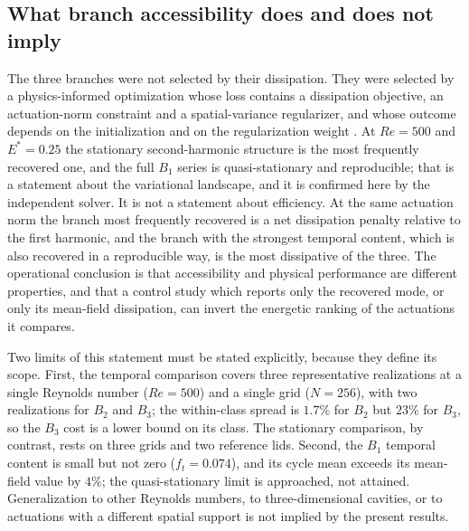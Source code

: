 \documentclass[11pt,a4paper]{article}
\newenvironment{chgdel}{\par\color{red}}{\par\color{black}}
\begin{document}
\subsection{What branch accessibility does and does not imply}

\begin{chgdel}
The three branches were not selected by their dissipation. They were selected by a
physics-informed optimization whose loss contains a dissipation objective, an
actuation-norm constraint and a spatial-variance regularizer, and whose outcome
depends on the initialization and on the regularization weight
. At $Re=500$ and $E^\ast=0.25$ the stationary
second-harmonic structure is the most frequently recovered one, and the full
$B_1$ series is quasi-stationary and reproducible; that is a statement about the
variational landscape, and it is confirmed here by the independent solver. It is
not a statement about efficiency. At the same actuation norm the branch most
frequently recovered is a net dissipation penalty relative to the first harmonic,
and the branch with the strongest temporal content, which is also recovered in a
reproducible way, is the most dissipative of the three. The operational
conclusion is that accessibility and physical performance are different
properties, and that a control study which reports only the recovered mode, or
only its mean-field dissipation, can invert the energetic ranking of the
actuations it compares.

Two limits of this statement must be stated explicitly, because they define its
scope. First, the temporal comparison covers three representative realizations at
a single Reynolds number ($Re=500$) and a single grid ($N=256$), with two
realizations for $B_2$ and $B_3$; the within-class spread is $1.7\%$ for $B_2$ but
$23\%$ for $B_3$, so the $B_3$ cost is a lower bound on its class. The stationary
comparison, by contrast, rests on three grids and two reference lids. Second, the
$B_1$ temporal content is small but not zero ($f_t=0.074$), and its cycle mean
exceeds its mean-field value by $4\%$; the quasi-stationary limit is approached,
not attained. Generalization to other Reynolds numbers, to three-dimensional
cavities, or to actuations with a different spatial support is not implied by the
present results.
\end{chgdel}
\end{document}
